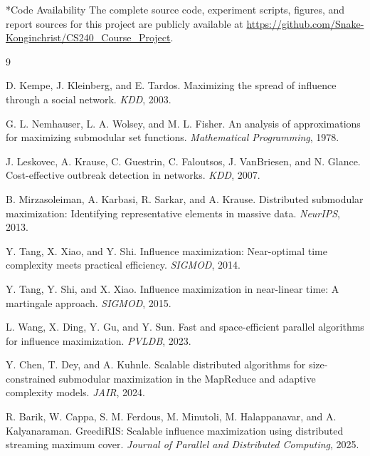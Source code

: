 \documentclass[9pt]{extarticle}
\makeatletter
\renewcommand\section{\@startsection{section}{1}{\z@}{0.28em}{0.08em}{\normalfont\large\bfseries}}
\makeatother
\begin{document}
\section*{Code Availability}
The complete source code, experiment scripts, figures, and report sources
for this project are publicly available at
\url{https://github.com/Snake-Konginchrist/CS240_Course_Project}.

\begin{thebibliography}{9}

D. Kempe, J. Kleinberg, and E. Tardos.
\newblock Maximizing the spread of influence through a social network.
\newblock \emph{KDD}, 2003.

G. L. Nemhauser, L. A. Wolsey, and M. L. Fisher.
\newblock An analysis of approximations for maximizing submodular set functions.
\newblock \emph{Mathematical Programming}, 1978.

J. Leskovec, A. Krause, C. Guestrin, C. Faloutsos, J. VanBriesen, and N. Glance.
\newblock Cost-effective outbreak detection in networks.
\newblock \emph{KDD}, 2007.

B. Mirzasoleiman, A. Karbasi, R. Sarkar, and A. Krause.
\newblock Distributed submodular maximization: Identifying representative elements in massive data.
\newblock \emph{NeurIPS}, 2013.

Y. Tang, X. Xiao, and Y. Shi.
\newblock Influence maximization: Near-optimal time complexity meets practical efficiency.
\newblock \emph{SIGMOD}, 2014.

Y. Tang, Y. Shi, and X. Xiao.
\newblock Influence maximization in near-linear time: A martingale approach.
\newblock \emph{SIGMOD}, 2015.

L. Wang, X. Ding, Y. Gu, and Y. Sun.
\newblock Fast and space-efficient parallel algorithms for influence maximization.
\newblock \emph{PVLDB}, 2023.

Y. Chen, T. Dey, and A. Kuhnle.
\newblock Scalable distributed algorithms for size-constrained submodular maximization in the MapReduce and adaptive complexity models.
\newblock \emph{JAIR}, 2024.

R. Barik, W. Cappa, S. M. Ferdous, M. Minutoli, M. Halappanavar, and A. Kalyanaraman.
\newblock GreediRIS: Scalable influence maximization using distributed streaming maximum cover.
\newblock \emph{Journal of Parallel and Distributed Computing}, 2025.

\end{thebibliography}
\end{document}
